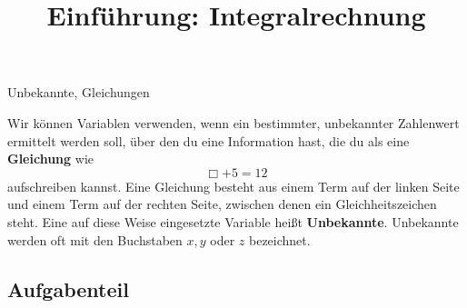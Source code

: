\documentclass[]{uebungsblatt}
\title{Einführung: Integralrechnung}
\begin{document}
\maketitle
\begin{contents}
    Unbekannte, Gleichungen
\end{contents}


\begin{remark}
    Wir können Variablen verwenden, wenn ein bestimmter, unbekannter Zahlenwert ermittelt werden soll, über den du eine Information hast, die du als eine \textbf{Gleichung} wie
    \[\Box+5=12\]
    aufschreiben kannst. Eine Gleichung besteht aus einem Term auf der linken Seite und einem Term auf der rechten Seite, zwischen denen ein Gleichheitszeichen steht. Eine auf diese Weise eingesetzte Variable heißt \textbf{Unbekannte}. Unbekannte werden oft mit den Buchstaben $x,y$ oder $z$ bezeichnet.
\end{remark}

\subsection*{Aufgabenteil}
\end{document}
